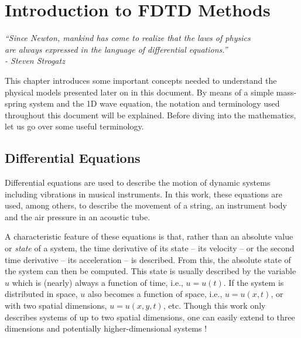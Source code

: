 \chapter{Introduction to FDTD Methods}\label{ch:FDTD}

\begin{flushright}{\it
``Since Newton, mankind has come to realize that the laws of physics\\
are always expressed in the language of differential equations.''\\
- Steven Strogatz} %
\end{flushright}
%
\vspace{2em}
This chapter introduces some important concepts needed to understand the physical models presented later on in this document. 
By means of a simple mass-spring system and the 1D wave equation, the notation and terminology used throughout this document will be explained. 
Before diving into the mathematics, let us go over some useful terminology.

\section{Differential Equations}
Differential equations are used to describe the motion of dynamic systems including vibrations in musical instruments. In this work, these equations are used, among others, to describe the movement of a string, an instrument body and the air pressure in an acoustic tube.

A characteristic feature of these equations is that, rather than an absolute value or \textit{state} of a system, the time derivative of its state -- its velocity -- or the second time derivative -- its acceleration -- is described. From this, the absolute state of the system can then be computed.
%
This state is usually described by the variable $u$ which is (nearly) always a function of time, i.e., $u=u(t)$. If the system is distributed in space, $u$ also becomes a function of space, i.e., $u = u(x,t)$, or with two spatial dimensions, $u = u(x,y,t)$, etc. Though this work only describes systems of up to two spatial dimensions, one can easily extend to three dimensions \cite{Hamilton2016} and potentially higher-dimensional systems \cite{Bustamante2017}! 

